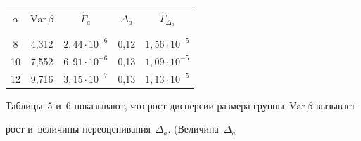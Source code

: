 \begin{table}\small %


\begin{center}


\parbox{206pt}{


}





\vspace*{2ex}





\begin{tabular}{|c|c|c|c|c|}


\hline


&&&&\\[-9pt]


$\alpha$& $\mathrm{Var}\, \hat{\beta}$ &  ${\hat\Gamma}_{a}$  & ${\Delta}_{a}$ & 


${\hat\Gamma}_{{\Delta}_{a}}$ \\ 


&&&&\\[-9pt] 


\hline


&&&&\\[-9pt]


\hphantom{9}8 & 4,312 &  $2{,}44\cdot 10^{-6} $&  0,12 & $1{,}56 \cdot 10^{-5}$  \\




 10&7,552& $6{,}91 \cdot 10^{-6} $&0,13 & $1{,}09 \cdot 10^{-5} $\\




 12&9,716&$ 3{,}15 \cdot 10^{-7}$ &  0,13 & $1{,}13 \cdot 10^{-5}$  \\


\hline


\end{tabular}


\end{center}


\vspace*{-9pt}


\end{table}





Таблицы~5 и~6 показывают, что рост дисперсии размера группы~$\mathrm{Var}\, \beta$ вызывает 


рост и~величины переоценивания~${\Delta}_{a}$. (Величина~${\Delta}_{a}$ 


